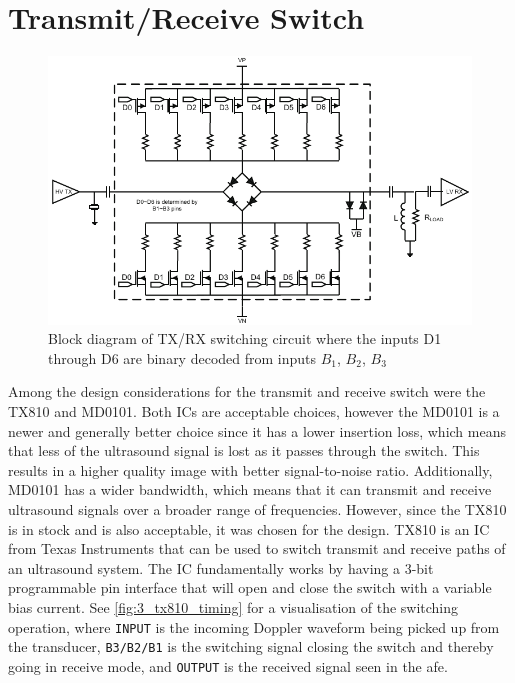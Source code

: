 \section{Transmit/Receive Switch}
\begin{figure}[htbp]
	\centering
	\includegraphics[width=.8\textwidth]{Figures/3_switch_tx810_block.pdf}
	\caption{Block diagram of TX/RX switching circuit where the inputs D1 through D6 are binary decoded from inputs $B_1$, $B_2$, $B_3$ \cite{TX810}}
	\label{fig:3_switch}
\end{figure}
Among the design considerations for the transmit and receive switch were the TX810\cite{TX810} and MD0101\cite{MD0101}. Both ICs are acceptable choices, however the MD0101 is a newer and generally better choice since it has a lower insertion loss, which means that less of the ultrasound signal is lost as it passes through the switch. This results in a higher quality image with better signal-to-noise ratio. Additionally, MD0101 has a wider bandwidth, which means that it can transmit and receive ultrasound signals over a broader range of frequencies. However, since the TX810 is in stock and is also acceptable, it was chosen for the design. TX810 is an IC from Texas Instruments that can be used to switch transmit and receive paths of an ultrasound system. The IC fundamentally works by having a 3-bit programmable pin interface that will open and close the switch with a variable bias current. See \cref{fig:3_tx810_timing} for a visualisation of the switching operation, where \texttt{INPUT} is the incoming Doppler waveform being picked up from the transducer, \texttt{B3/B2/B1} is the switching signal closing the switch and thereby going in receive mode, and \texttt{OUTPUT} is the received signal seen in the \gls{afe}.
